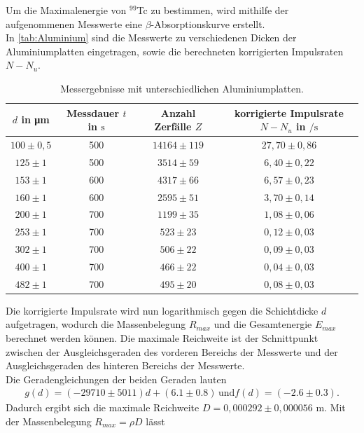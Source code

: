 Um die Maximalenergie von $^{99}$Tc zu bestimmen, wird mithilfe der aufgenommenen Messwerte eine
$\beta$-Absorptionskurve erstellt.\\
In \autoref{tab:Aluminium} sind die Messwerte zu verschiedenen Dicken der Aluminiumplatten eingetragen,
sowie die berechneten korrigierten Impulsraten $N - N_u$.
\begin{table}
  \centering
  \caption{Messergebnisse mit unterschiedlichen Aluminiumplatten.}
  \label{tab:Alluminium}
  \begin{tabular}{c c c c}
    $d$ in \si{\micro\meter} & Messdauer $t$ in $\si{\second}$ & Anzahl Zerfälle $Z$  &  korrigierte Impulsrate $N-N_u$ in $\si{\per\second}$\\
       \midrule
       $100 \pm 0,5$ &    500  &   $14164 \pm 119$  & $27,70 \pm 0,86$ \\
       $125 \pm 1$ &   500   &   $3514 \pm 59$  &     $6,40 \pm 0,22$\\
       $153 \pm 1$  & 600   &   $4317 \pm 66$ &       $6,57 \pm 0,23$\\
       $160 \pm 1$  &  600  &    $2595 \pm 51$  &     $3,70 \pm 0,14$\\
       $200 \pm 1$  & 700    &  $1199 \pm 35$ &       $1,08 \pm 0,06$\\
       $253 \pm 1$  &  700   &    $523 \pm 23$  &     $0,12 \pm 0,03$\\
       $302 \pm 1$  & 700    &  $ 506 \pm 22$ &       $0,09 \pm 0,03$\\
       $400 \pm 1$  & 700   &    $466 \pm 22$ &       $0,04 \pm 0,03$\\
       $482 \pm 1$  &  700  &    $ 495 \pm 20$  &     $0,08 \pm 0,03$\\
      \bottomrule
    \end{tabular}
\end{table}
Die korrigierte Impulsrate wird nun logarithmisch gegen die Schichtdicke $d$ aufgetragen, wodurch die
Massenbelegung $R_{max}$ und die Gesamtenergie $E_{max}$ berechnet werden können. Die maximale Reichweite
ist der Schnittpunkt zwischen der Ausgleichsgeraden des vorderen Bereichs der Messwerte und der Ausgleichsgeraden
des hinteren Bereichs der Messwerte.\\
Die Geradengleichungen der beiden Geraden lauten
\begin{align*}
  g(d) = (-29710 \pm 5011)d + (6.1 \pm 0.8) \, \mathrm{und}
  f(d) = (-2.6 \pm 0.3).
\end{align*}
Dadurch ergibt sich die maximale Reichweite $D = 0,000292 \pm 0,000056$ m. Mit der Massenbelegung $R_{max} = \rho D$ lässt
